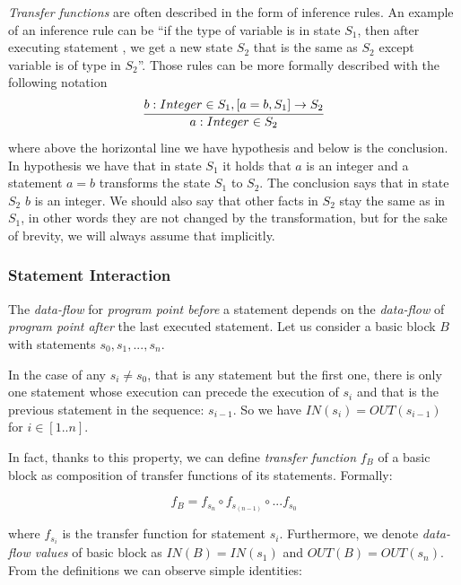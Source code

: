         \emph{Transfer functions} are often described in the form of inference rules. 
        An example of an inference rule can be 
        ``if the type of variable  is  in state $S_1$, 
        then after executing statement , we get a new state $S_2$ that 
        is the same as $S_2$ except variable  is of type  in $S_2$''. 
        Those rules can be more formally described with the following notation        
        $$
        \infer{a:Integer\in{}S_2}{b:Integer \in S_1, [a=b, S_1] \rightarrow S_2}
        $$        
        where above the horizontal line we have hypothesis and below is 
        the conclusion. In hypothesis we have that in state $S_1$ it 
        holds that $a$ is an integer and a statement $a=b$ transforms 
        the state $S_1$ to $S_2$. The conclusion says that in state 
        $S_2$ $b$ is an integer. We should also say that other 
        facts in $S_2$ stay the same as in $S_1$, in other words they 
        are not changed by the transformation, but for the sake 
        of brevity, we will always assume that implicitly.
        
        \subsubsection*{Statement Interaction}
        
        The \emph{data-flow} for \emph{program point before} a statement 
        depends on the \emph{data-flow} of \emph{program point after} the 
        last executed statement. Let us consider a basic block $B$ with 
        statements $s_0, s_1, ..., s_n$.
        
        In the case of any $s_i \neq s_0$, that is any statement but 
        the first one, there is only one statement whose execution 
        can precede the execution of $s_i$ and that is the previous statement 
        in the sequence: $s_{i-1}$. So we have $IN(s_i) = OUT(s_{i-1})$ 
        for $i\in{[1..n]}$. 
        
        In fact, thanks to this property, we can define \emph{transfer function} 
        $f_B$ of a basic block as composition of transfer functions of 
        its statements. Formally: 
        
        \[ f_B = f_{s_n} \circ f_{s_{(n-1)}} \circ ... f_{s_0} \]
        
        where $f_{s_i}$ is the transfer function for statement $s_i$.            
        Furthermore, we denote \emph{data-flow values} of basic block as 
        $IN(B)=IN(s_1)$ and $OUT(B)=OUT(s_n)$. From the definitions we can 
        observe simple identities: 
        
